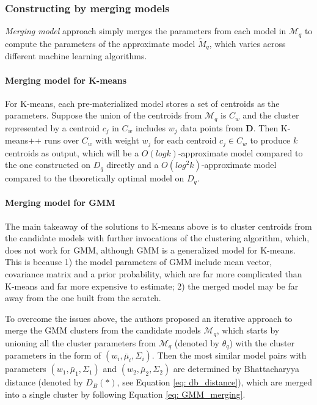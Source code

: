 \subsubsection{Constructing by merging models}
{\em Merging model} approach simply merges the parameters from each model in $\mathcal{M}_q$ to compute the parameters of the approximate model $\tilde{M}_q$, which varies across different machine learning algorithms.

\paragraph{Merging model for K-means}
For K-means, each pre-materialized model stores a set of centroids as the parameters. Suppose the union of the centroids from $\mathcal{M}_q$ is $C_w$ and the cluster represented by a centroid $c_j$ in $C_w$ includes $w_j$ data points from $\textbf{D}$. Then K-means++ \cite{arthur2007k} runs over $C_w$ with weight $w_j$ for each centroid $c_j \in C_w$ to produce $k$ centroids as output, which will be a $O(log k)$-approximate model compared to the one constructed on $D_q$ directly and a $O(log^2k)$-approximate model compared to the theoretically optimal model on $D_q$.

\paragraph{Merging model for GMM}
The main takeaway of the solutions to K-means above is to cluster centroids from the candidate models with further invocations of the clustering algorithm, which, does not work for GMM, although GMM is a generalized model for K-means. This is because 1) the model parameters of GMM include mean vector, covariance matrix and a prior probability, which are far more complicated than K-means and far more expensive to estimate; 2) the merged model may be far away from the one built from the scratch. 

To overcome the issues above, the authors proposed an iterative approach to merge the GMM clusters from the candidate models $\mathcal{M}_q$, which starts by unioning all the cluster parameters from $\mathcal{M}_q$ (denoted by $\theta_q$) with the cluster parameters in the form of $(w_i, \bar{\mu}_i, \Sigma_i)$.
Then the most similar model pairs with parameters $(w_1, \bar{\mu}_1, \Sigma_1)$ and $(w_2, \bar{\mu}_2, \Sigma_2)$ are determined by Bhattacharyya distance \cite{bhattacharyya1943measure} (denoted by $D_B(*)$, see Equation \ref{eq: db_distance}), which are merged into a single cluster by following Equation \ref{eq: GMM_merging}.

